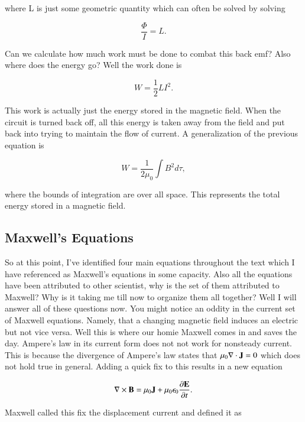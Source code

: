 \documentclass[preprint, review,12pt]{elsarticle}
\def\x{\times}
\def\.{\cdot}
\def\b{\textbf}
\def\div{\nabla \.}
\def\curl{\nabla \x}
\newcommand{\pd}[2]{\frac{\partial #1 }{\partial #2}}
\begin{document}
where L is just some geometric quantity which can often be solved by solving

\begin{equation}
    \frac{\Phi}{I} = L.
\end{equation}

Can we calculate how much work must be done to combat this back emf? Also where does the energy go? Well the work done is 

\begin{equation}
    W = \frac{1}{2}LI^2. 
\end{equation}

This work is actually just the energy stored in the magnetic field. When the circuit is turned back off, all this energy is taken away from the field and put back into trying to maintain the flow of current. A generalization of the previous equation is 

\begin{equation}
    W = \frac{1}{2 \mu_0} \int B^2 d\tau,
\end{equation}

where the bounds of integration are over all space. This represents the total energy stored in a magnetic field. 

\subsection{Maxwell's Equations}

So at this point, I've identified four main equations throughout the text which I have referenced as Maxwell's equations in some capacity. Also all the equations have been attributed to other scientist, why is the set of them attributed to Maxwell? Why is it taking me till now to organize them all together? Well I will answer all of these questions now. You might notice an oddity in the current set of Maxwell equations. Namely, that a changing magnetic field induces an electric but not vice versa. Well this is where our homie Maxwell comes in and saves the day. Ampere's law in its current form does not not work for nonsteady current. This is because the divergence of Ampere's law states that $\mu_0 \div \b J = 0$ which does not hold true in general. Adding a quick fix to this results in a new equation

\begin{equation}
    \curl \b B = \mu_0 \b J + \mu_0 \epsilon_0 \pd{\b E}{t}.
\end{equation}

Maxwell called this fix the displacement current and defined it as 
\end{document}
